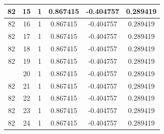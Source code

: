 \documentclass[12pt,a4paper]{article}
\numberwithin{equation}{section}
\numberwithin{figure}{section}
\numberwithin{table}{section}
\begin{document}
\begin{longtable}{|c|c|c|c|c|c|}
82 & 15 & 1 & 0.867415 & -0.404757 & 0.289419 \\ \hline
82 & 16 & 1 & 0.867415 & -0.404757 & 0.289419 \\ \hline
82 & 17 & 1 & 0.867415 & -0.404757 & 0.289419 \\ \hline
82 & 18 & 1 & 0.867415 & -0.404757 & 0.289419 \\ \hline
82 & 19 & 1 & 0.867415 & -0.404757 & 0.289419 \\ \hline
\pagebreak
82 & 20 & 1 & 0.867415 & -0.404757 & 0.289419 \\ \hline
82 & 21 & 1 & 0.867415 & -0.404757 & 0.289419 \\ \hline
82 & 22 & 1 & 0.867415 & -0.404757 & 0.289419 \\ \hline
82 & 23 & 1 & 0.867415 & -0.404757 & 0.289419 \\ \hline
82 & 24 & 1 & 0.867415 & -0.404757 & 0.289419 \\ \hline
	\end{longtable}
	
	\clearpage
	
\end{document}

